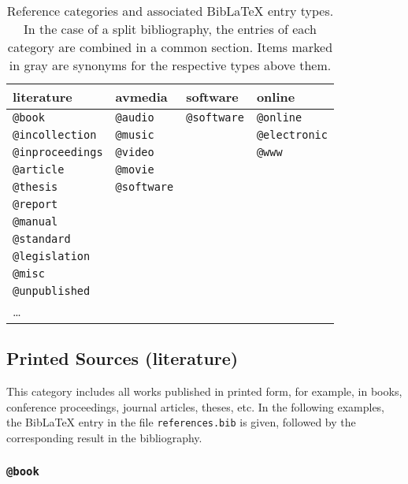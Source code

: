 \begin{table}
\caption{Reference categories and associated BibLaTeX entry types. In the case
of a split bibliography, the entries of each category are combined in a
common section. Items marked in gray are synonyms for the respective
types above them.}
\label{tab:reference-categories}
\centering
{}
\setlength{\tabcolsep}{4mm}
\begin{tabular}{@{}llll@{}}
	\toprule
	\textsf{literature} & \textsf{avmedia} & \textsf{software} & \textsf{online} \\
	\midrule
	\texttt{@book} & \texttt{@audio} & \texttt{@software} & \texttt{@online} \\
	\texttt{@incollection} & \texttt{\color{midgray}@music} & & \texttt{\color{midgray}@electronic} \\
	\texttt{@inproceedings} & \texttt{@video} & & \texttt{\color{midgray}@www} \\
	\texttt{@article} & \texttt{@movie} & & \\
	\texttt{@thesis} & \texttt{@software} & & \\
	\texttt{@report} & & & \\
	\texttt{@manual} & & & \\
	\texttt{@standard} & & & \\
	\texttt{@legislation} & & & \\
	\texttt{@misc} & & &  \\
	\texttt{@unpublished} &  & & \\
	\ldots & & & \\
	\bottomrule
\end{tabular}
\end{table}


\subsection{Printed Sources (\textsf{literature})}
\label{sec:category-literature}

This category includes all works published in printed form, for example, in
books, conference proceedings, journal articles, theses, etc. In the following
examples, the BibLaTeX entry in the file \nolinkurl{references.bib} is given,
followed by the corresponding result in the bibliography.

\subsubsection{\texttt{\bfseries @book}}
\label{sec:@book}

